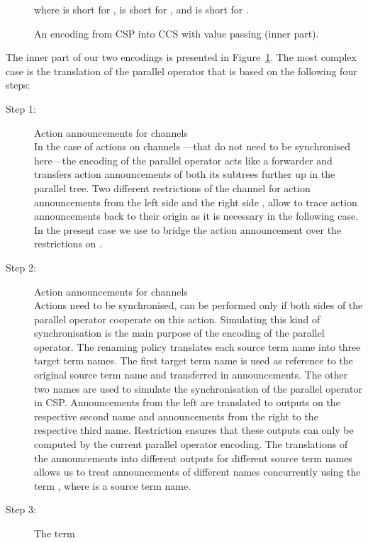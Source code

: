 \documentclass[]{eptcs}
\begin{document}
\begin{figure}[htp]
	
	where  is short for ,  is short for , and  is short for .
	\caption{An encoding from CSP into CCS with value passing (inner part).}
	\label{fig:innerEncoding}
\end{figure}
The inner part of our two encodings is presented in Figure~\ref{fig:innerEncoding}. The most complex case is the translation of the parallel operator  that is based on the following four steps:
\begin{description}
	\item[Step 1:] Action announcements for channels \\
		In the case of actions on channels ---that do not need to be synchronised here---the encoding of the parallel operator acts like a forwarder and transfers action announcements of both its subtrees further up in the parallel tree.
		Two different restrictions of the channel for action announcements  from the left side  and the right side , allow to trace action announcements back to their origin as it is necessary in the following case.
		In the present case we use  to bridge the action announcement over the restrictions on .
	\item[Step 2:] Action announcements for channels \\
		Actions  need to be synchronised, \ie can be performed only if both sides of the parallel operator cooperate on this action. Simulating this kind of synchronisation is the main purpose of the encoding of the parallel operator.
		The renaming policy  translates each source term name into three target term names. The first target term name is used as reference to the original source term name and transferred in announcements. The other two names are used to simulate the synchronisation of the parallel operator in CSP. Announcements from the left are translated to outputs on the respective second name and announcements from the right to the respective third name. Restriction ensures that these outputs can only be computed by the current parallel operator encoding. The translations of the announcements into different outputs for different source term names allows us to treat announcements of different names concurrently using the term , where  is a source term name.
	\item[Step 3:] The term \\

\end{description}
\end{document}
